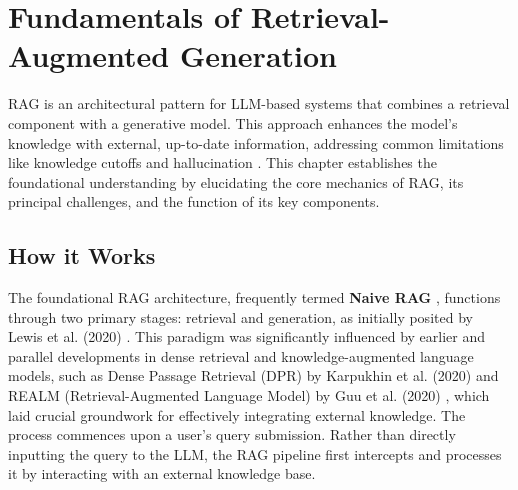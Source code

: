 \chapter{Fundamentals of Retrieval-Augmented Generation}
\label{chap:fundamentals_rag}

RAG is an architectural pattern for LLM-based systems that combines a retrieval component with a generative model. This approach enhances the model's knowledge with external, up-to-date information, addressing common limitations like knowledge cutoffs and hallucination \autocite{lewis2021retrievalaugmentedgenerationknowledgeintensivenlp, gao2024retrievalaugmentedgenerationlargelanguage}. This chapter establishes the foundational understanding by elucidating the core mechanics of RAG, its principal challenges, and the function of its key components.

\section{How it Works}
The foundational RAG architecture, frequently termed \textbf{Naive RAG} \autocite{gao2024retrievalaugmentedgenerationlargelanguage}, functions through two primary stages: retrieval and generation, as initially posited by Lewis et al. (2020) \autocite{lewis2021retrievalaugmentedgenerationknowledgeintensivenlp}. This paradigm was significantly influenced by earlier and parallel developments in dense retrieval and knowledge-augmented language models, such as Dense Passage Retrieval (DPR) by Karpukhin et al. (2020) \autocite{karpukhin2020densepassageretrievalopendomain} and REALM (Retrieval-Augmented Language Model) by Guu et al. (2020) \autocite{guu2020realm}, which laid crucial groundwork for effectively integrating external knowledge. The process commences upon a user's query submission. Rather than directly inputting the query to the LLM, the RAG pipeline first intercepts and processes it by interacting with an external knowledge base.

